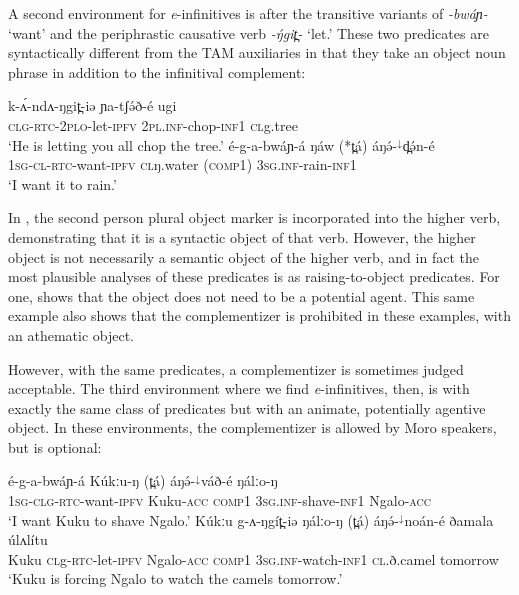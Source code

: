 A second environment for \textit{e}-infinitives is after the transitive variants of \textit{-bwáɲ-} `want' and the periphrastic causative verb \textit{-ŋ́git̪-} `let.' These two predicates are syntactically different from the TAM auxiliaries in that they take an object noun phrase in addition to the infinitival complement:

\ea  \gll 	k-ʌ́-ndʌ-ŋgit̪-iə                    ɲa-tʃə́ð-é         ugi\\
	\textsc{clg}-\textsc{rtc}-\textsc{2plo}-let-\textsc{ipfv}   \textsc{2pl.inf}-chop-\textsc{inf1}  \textsc{cl}g.tree \\
		\glt ‘He is letting you all chop the tree.’ \label{ex:ch15:tree1}
	\ex  \gll  é-g-a-bwáɲ-á ŋáw (*t̪á) áŋə́-$^{↓}$d̪ə́n-é \\
\textsc{1sg-cl-rtc}-want-\textsc{ipfv} \textsc{cl}ŋ.water (\textsc{comp1}) \textsc{3sg.inf}-rain-\textsc{inf1} \\
		\glt `I want it to rain.' \label{ex:ch15:rain1}
	\z 

In , the second person plural object marker is incorporated into the higher verb, demonstrating that it is a syntactic object of that verb. However, the higher object is not necessarily a semantic object of the higher verb, and in fact the most plausible analyses of these predicates is as raising-to-object predicates. For one,  shows that the object does not need to be a potential agent. This same example also shows that the complementizer is prohibited in these examples, with an athematic object.

However, with the same predicates, a complementizer is sometimes judged acceptable. The third environment where we find \textit{e}-infinitives, then, is with exactly the same class of predicates but with an animate, potentially agentive object. In these environments, the complementizer is allowed by Moro speakers, but is optional:

\ea 
	\ea	\gll  	é-g-a-bwáɲ-á                Kúkːu-ŋ       (t̪á)       áŋə́-$^{↓}$váð-é     ŋálːo-ŋ\\
\textsc{1sg-clg-rtc}-want-\textsc{ipfv}  Kuku-\textsc{acc} \textsc{comp1}  \textsc{3sg.inf}-shave-\textsc{inf1}   Ngalo-\textsc{acc}\\
		\glt `I want Kuku to shave Ngalo.'
	\ex  \gll  Kúkːu g-ʌ-ŋgít̪-iə ŋálːo-ŋ (t̪á) áŋə́-$^{↓}$noán-é ðamala úlʌlítu  \\
Kuku \textsc{cl}g-\textsc{rtc}-let-\textsc{ipfv}  Ngalo-\textsc{acc} \textsc{comp1}  \textsc{3sg.inf}-watch-\textsc{inf1}   \textsc{cl}.ð.camel  tomorrow\\
		\glt `Kuku is forcing Ngalo to watch the camels tomorrow.'
\z 
\z 

